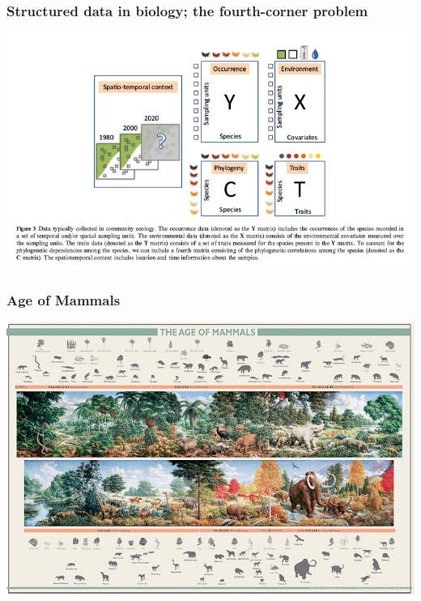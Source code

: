 \documentclass{beamer}
\begin{document}
\begin{frame}
  \frametitle{Structured data in biology; the fourth-corner problem}

  \begin{center}
    \includegraphics[width = \textwidth,height = 0.8\textheight,keepaspectratio = true]{figure/ovaskainen_data}
  \end{center}

  \tiny{}
\end{frame}


\begin{frame}
  \frametitle{Age of Mammals}
  \begin{center}
    \includegraphics[width = \textwidth,height = 0.8\textheight,keepaspectratio = true]{figure/aom}
  \end{center}
\end{frame}
\end{document}
